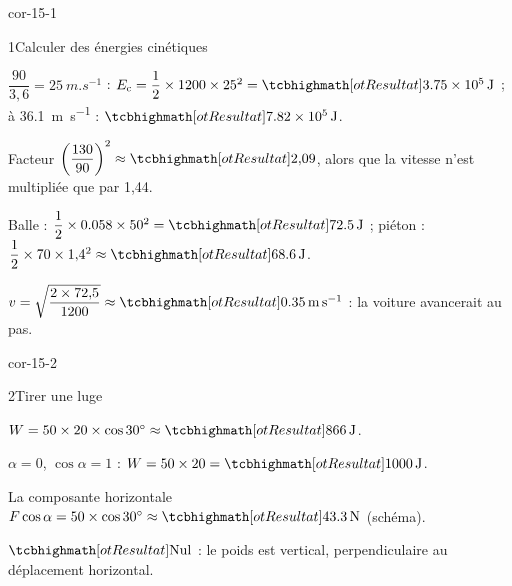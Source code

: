 \corrigesSouples

\begin{blocLivre}{cor-15-1}
\begin{corrige}{1}{Calculer des énergies cinétiques}
\begin{questions}
\item $\dfrac{90}{3{,}6}=\qty{25}{m.s^{-1}}$ : $E_\mathrm{c}=\dfrac{1}{2}\times1200\times25^2=\res{\qty{3,75e5}{J}}$ ; à \qty{36,1}{m.s^{-1}} : $\res{\qty{7,82e5}{J}}$.
\item Facteur $\left(\dfrac{130}{90}\right)^2\approx\res{2{,}09}$, alors que la vitesse n'est multipliée que par 1,44.
\item Balle : $\dfrac{1}{2}\times\num{0,058}\times50^2=\res{\qty{72,5}{J}}$ ; piéton : $\dfrac{1}{2}\times70\times1{,}4^2\approx\res{\qty{68,6}{J}}$.
\item $v=\sqrt{\dfrac{2\times72{,}5}{1200}}\approx\res{\qty{0,35}{m.s^{-1}}}$ : la voiture avancerait au pas.
\end{questions}
\end{corrige}
\end{blocLivre}
\begin{blocLivre}{cor-15-2}
\begin{corrige}{2}{Tirer une luge}
\begin{questions}
\item $W=50\times20\times\cos\ang{30}\approx\res{\qty{866}{J}}$.
\item $\alpha=0$, $\cos\alpha=1$ : $W=50\times20=\res{\qty{1000}{J}}$.
\item La composante horizontale $F\cos\alpha=50\times\cos\ang{30}\approx\res{\qty{43,3}{N}}$ (schéma).
\item $\res{\text{Nul}}$ : le poids est vertical, perpendiculaire au déplacement horizontal.
\end{questions}
\end{corrige}
\end{blocLivre}
